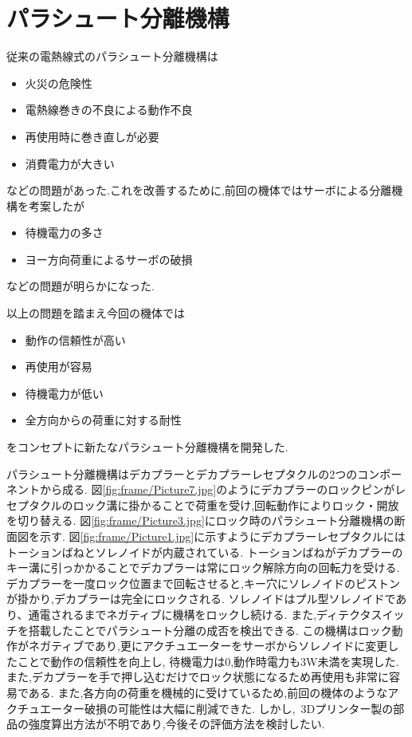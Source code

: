 \section{パラシュート分離機構}
従来の電熱線式のパラシュート分離機構は
\begin{itemize}
  \item 火災の危険性
  \item 電熱線巻きの不良による動作不良
  \item 再使用時に巻き直しが必要
  \item 消費電力が大きい
\end{itemize}
などの問題があった.これを改善するために,前回の機体ではサーボによる分離機構を考案したが
\begin{itemize}
  \item 待機電力の多さ
  \item ヨー方向荷重によるサーボの破損
\end{itemize}
などの問題が明らかになった.

以上の問題を踏まえ今回の機体では
\begin{itemize}
  \item 動作の信頼性が高い
  \item 再使用が容易
  \item 待機電力が低い
  \item 全方向からの荷重に対する耐性
\end{itemize}
をコンセプトに新たなパラシュート分離機構を開発した.

パラシュート分離機構はデカプラーとデカプラーレセプタクルの2つのコンポーネントから成る.
\newpage
{}
図\ref{fig:frame/Picture7.jpg}のようにデカプラーのロックピンがレセプタクルのロック溝に掛かることで荷重を受け,回転動作によりロック・開放を切り替える.
図\ref{fig:frame/Picture3.jpg}にロック時のパラシュート分離機構の断面図を示す.
図\ref{fig:frame/Picture1.jpg}に示すようにデカプラーレセプタクルにはトーションばねとソレノイドが内蔵されている.
トーションばねがデカプラーのキー溝に引っかかることでデカプラーは常にロック解除方向の回転力を受ける.
デカプラーを一度ロック位置まで回転させると,キー穴にソレノイドのピストンが掛かり,デカプラーは完全にロックされる.
ソレノイドはプル型ソレノイドであり、通電されるまでネガティブに機構をロックし続ける.
また,ディテクタスイッチを搭載したことでパラシュート分離の成否を検出できる.
この機構はロック動作がネガティブであり,更にアクチュエーターをサーボからソレノイドに変更したことで動作の信頼性を向上し,
待機電力は0,動作時電力も3\si{\watt}未満を実現した.また,デカプラーを手で押し込むだけでロック状態になるため再使用も非常に容易である.
また,各方向の荷重を機械的に受けているため,前回の機体のようなアクチュエーター破損の可能性は大幅に削減できた.
しかし,\ 3Dプリンター製の部品の強度算出方法が不明であり,今後その評価方法を検討したい.

